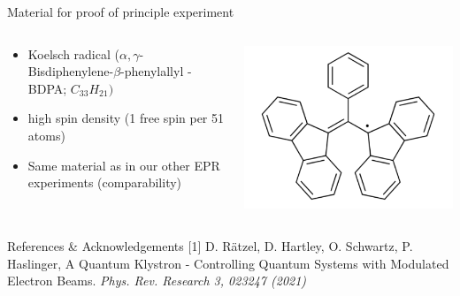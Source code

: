 \documentclass[final]{beamer}
\begin{document}
\begin{frame}[fragile]{}
\begin{columns}[T]
\begin{column}{.49\linewidth}
	\begin{block}{\Large Material for proof of principle experiment}
		\begin{columns}
			\begin{column}{0.45\columnwidth}
				\begin{itemize}
					\item Koelsch radical ($\alpha,\gamma$-Bisdiphenylene-$\beta$-phenylallyl - BDPA; $C_{33}H_{21})$
					\item high spin density (1 free spin per 51 atoms)
					\item Same material as in our other EPR experiments (comparability)
				\end{itemize}
			\end{column}
			\begin{column}{0.45\columnwidth}
				\includegraphics[width=\columnwidth]{./figures/bdpa.png}	
			\end{column}
		\end{columns}
	\end{block}

      \begin{block}{\Large References \& Acknowledgements}
        [1] D. Rätzel, D. Hartley, O. Schwartz, P. Haslinger, A Quantum
        Klystron - Controlling Quantum Systems with Modulated Electron Beams.
        \textit{Phys. Rev. Research 3, 023247 (2021)}
      \end{block}


\end{column}
\end{columns}
\end{frame}
\end{document}
